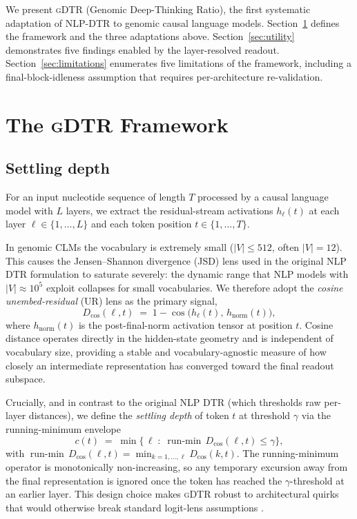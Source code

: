 \documentclass[12pt]{article}
\theoremstyle{plain}
\theoremstyle{definition}
\theoremstyle{remark}
\newcommand{\gDTR}{\textsc{gDTR}}
\newcommand{\DTR}{\textsc{DTR}}
\newcommand{\hl}{h_{\ell}}
\newcommand{\hnorm}{h_{\mathrm{norm}}}
\newcommand{\Dcos}{D_{\cos}}
\newcommand{\runmin}{\operatorname{run\text{-}min}}
\begin{document}
We present \gDTR{} (Genomic Deep-Thinking Ratio), the first systematic
adaptation of NLP-\DTR{} to genomic causal language models.
Section~\ref{sec:framework} defines the framework and the three
adaptations above. Section~\ref{sec:utility} demonstrates five findings
enabled by the layer-resolved readout. Section~\ref{sec:limitations}
enumerates five limitations of the framework, including a
final-block-idleness assumption that requires per-architecture
re-validation.

\section{The \gDTR{} Framework}
\label{sec:framework}

\subsection{Settling depth}
\label{sec:settling}

For an input nucleotide sequence of length $T$ processed by a causal
language model with $L$ layers, we extract the residual-stream
activations $\hl(t)$ at each layer
$\ell\in\{1,\dots,L\}$ and each token position $t\in\{1,\dots,T\}$.

In genomic CLMs the vocabulary is extremely small
($|V|\le 512$, often $|V|=12$). This causes the
Jensen--Shannon divergence (JSD) lens used in the original NLP
\DTR{} formulation to saturate severely: the dynamic range that NLP
models with $|V|\approx 10^5$ exploit collapses for small vocabularies.
We therefore adopt the \emph{cosine unembed-residual} (UR) lens as the
primary signal,
\begin{equation}
  \Dcos(\ell, t) \;=\; 1 - \cos\!\bigl(\hl(t),\, \hnorm(t)\bigr),
  \label{eq:cos-lens}
\end{equation}
where $\hnorm(t)$ is the post-final-norm activation tensor at position
$t$. Cosine distance operates directly in the hidden-state geometry and
is independent of vocabulary size, providing a stable and
vocabulary-agnostic measure of how closely an intermediate
representation has converged toward the final readout subspace.

Crucially, and in contrast to the original NLP \DTR{} (which thresholds
raw per-layer distances), we define the \emph{settling depth} of token
$t$ at threshold $\gamma$ via the running-minimum envelope
\begin{equation}
  c(t) \;=\; \min\bigl\{\, \ell \;:\; \runmin\,\Dcos(\ell, t) \le \gamma\bigr\},
  \label{eq:settling}
\end{equation}
with $\runmin\,\Dcos(\ell, t) = \min_{k=1,\dots,\ell}\Dcos(k, t)$. The
running-minimum operator is monotonically non-increasing, so any
temporary excursion away from the final representation is ignored once
the token has reached the $\gamma$-threshold at an earlier layer. This
design choice makes \gDTR{} robust to architectural quirks that would
otherwise break standard logit-lens assumptions
\cite{nostalgebraist2020logitlens,belrose2023tunedlens}.
\end{document}
